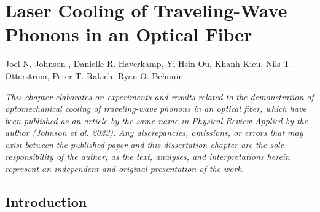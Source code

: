 \setcounter{rownumber}{0}
\chapter{Laser Cooling of Traveling-Wave Phonons in an Optical Fiber}
\label{ch:Cooling}
\acresetall

Joel N. Johnson%
,
Danielle R. Haverkamp,
Yi-Hsin Ou,
Khanh Kieu,
Nils T. Otterstrom,
Peter T. Rakich,
Ryan O. Behunin

\hfill

\textit{This chapter elaborates on experiments and results related to the demonstration of optomechanical cooling of traveling-wave phonons in an optical fiber, which have been published as an article by the same name in Physical Review Applied by the author (Johnson et al. 2023).}  \textit{Any discrepancies, omissions, or errors that may exist between the published paper and this dissertation chapter are the sole responsibility of the author, as the text, analyses, and interpretations herein represent an independent and original presentation of the work.}


\section{Introduction}
\label{Cooling:sec:Introduction}

